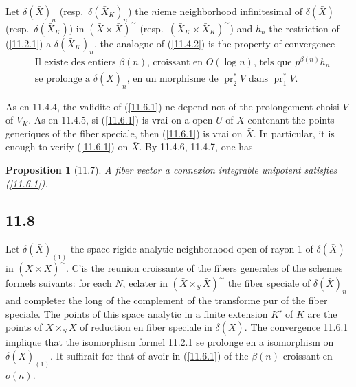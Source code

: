 \documentclass[12pt,a4paper]{article}
\theoremstyle{plain}
\newtheorem{proposition}[theorem]{Proposition}
\theoremstyle{definition}
\theoremstyle{remark}
\DeclareMathOperator{\pr}{pr}
\begin{document}
Let $\delta(\bar{X})_n$ (resp.~$\delta(\bar{X}_K)_n$) the $n$ieme neighborhood infinitesimal of $\delta(\bar{X})$ (resp.~$\delta(\bar{X}_K)$) in $(\bar{X} \times \bar{X})^\sim$ (resp.~$(\bar{X}_K \times \bar{X}_K)^\sim$) and $h_n$ the restriction of (\ref{11.2.1}) a $\delta(\bar{X}_K)_n$. the analogue of (\ref{11.4.2}) is the property of convergence
\begin{equation}\label{11.6.1}
\begin{aligned}
&\text{Il existe des entiers } \beta(n) \text{, croissant en } O(\log n) \text{, tels que } p^{\beta(n)} h_n \\
&\text{se prolonge a } \delta(\bar{X})_n \text{, en un morphisme de } \pr_2^* \bar{V} \text{ dans } \pr_1^* \bar{V}.
\end{aligned} \tag{11.6.1}
\end{equation}

As en 11.4.4, the validite of (\ref{11.6.1}) ne depend not of the prolongement choisi $\bar{V}$ of $V_K$. As en 11.4.5, si (\ref{11.6.1}) is vrai on a open $U$ of $\bar{X}$ contenant the points generiques of the fiber speciale, then (\ref{11.6.1}) is vrai on $\bar{X}$. In particular, it is enough to verify (\ref{11.6.1}) on $\bar{X}$. By 11.4.6, 11.4.7, one has

\begin{proposition}[11.7]
A fiber vector a connexion integrable unipotent satisfies (\ref{11.6.1}).
\end{proposition}

\subsection*{11.8}

Let $\delta(\bar{X})_{(1)}$ the space rigide analytic neighborhood open of rayon 1 of $\delta(\bar{X})$ in $(\bar{X} \times \bar{X})^\sim$. C'is the reunion croissante of the fibers generales of the schemes formels suivants: for each $N$, eclater in $(\bar{X} \times_S \bar{X})^\sim$ the fiber speciale of $\delta(\bar{X})_n$ and completer the long of the complement of the transforme pur of the fiber speciale. The points of this space analytic in a finite extension $K'$ of $K$ are the points of $\bar{X} \times_S \bar{X}$ of reduction en fiber speciale in $\delta(\bar{X})$. The convergence 11.6.1 implique that the isomorphism formel 11.2.1 se prolonge en a isomorphism on $\delta(\bar{X})_{(1)}$. It suffirait for that of avoir in (\ref{11.6.1}) of the $\beta(n)$ croissant en $o(n)$.
\end{document}
